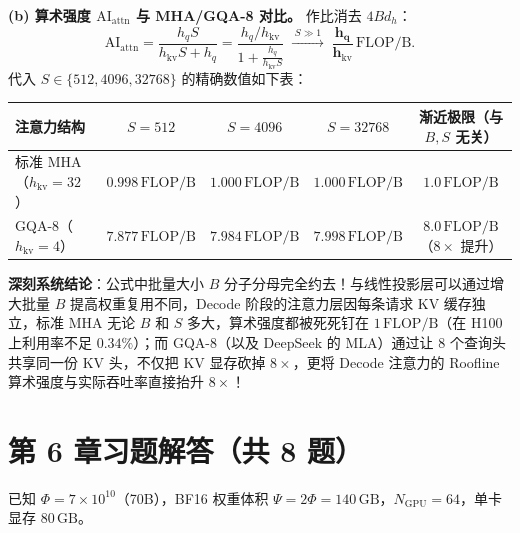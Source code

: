 \textbf{(b) 算术强度 $\mathrm{AI}_{\mathrm{attn}}$ 与 MHA/GQA-8 对比。} 作比消去 $4 B d_h$：
\[
  \mathrm{AI}_{\mathrm{attn}} = \frac{h_q S}{h_{\mathrm{kv}} S + h_q} = \frac{h_q / h_{\mathrm{kv}}}{1 + \frac{h_q}{h_{\mathrm{kv}} S}}
  \;\xrightarrow{\;S \gg 1\;}\; \mathbf{\frac{h_q}{h_{\mathrm{kv}}}\,\mathrm{FLOP/B}}.
\]
代入 $S \in \{512, 4096, 32768\}$ 的精确数值如下表：
\begin{center}
\footnotesize
\begin{tabular}{lcccc}
\toprule
注意力结构 & $S = 512$ & $S = 4096$ & $S = 32768$ & 渐近极限（与 $B, S$ 无关） \\
\midrule
标准 MHA（$h_{\mathrm{kv}} = 32$） & $0.998\,\mathrm{FLOP/B}$ & $1.000\,\mathrm{FLOP/B}$ & $1.000\,\mathrm{FLOP/B}$ & $\mathbf{1.0\,\mathrm{FLOP/B}}$ \\
GQA-8（$h_{\mathrm{kv}} = 4$） & $7.877\,\mathrm{FLOP/B}$ & $7.984\,\mathrm{FLOP/B}$ & $7.998\,\mathrm{FLOP/B}$ & $\mathbf{8.0\,\mathrm{FLOP/B}}$（$8\times$ 提升） \\
\bottomrule
\end{tabular}
\end{center}
\textbf{深刻系统结论}：公式中批量大小 $B$ 分子分母完全约去！与线性投影层可以通过增大批量 $B$ 提高权重复用不同，Decode 阶段的注意力层因每条请求 KV 缓存独立，标准 MHA 无论 $B$ 和 $S$ 多大，算术强度都被死死钉在 $1\,\mathrm{FLOP/B}$（在 H100 上利用率不足 $0.34\%$）；而 GQA-8（以及 DeepSeek 的 MLA）通过让 $8$ 个查询头共享同一份 KV 头，不仅把 KV 显存砍掉 $8\times$，更将 Decode 注意力的 Roofline 算术强度与实际吞吐率直接抬升 $8\times$！

\section*{第 6 章习题解答（共 8 题）}


已知 $\Phi = 7 \times 10^{10}$（70B），BF16 权重体积 $\Psi = 2\Phi = 140\,\mathrm{GB}$，$N_{\mathrm{GPU}} = 64$，单卡显存 $80\,\mathrm{GB}$。

